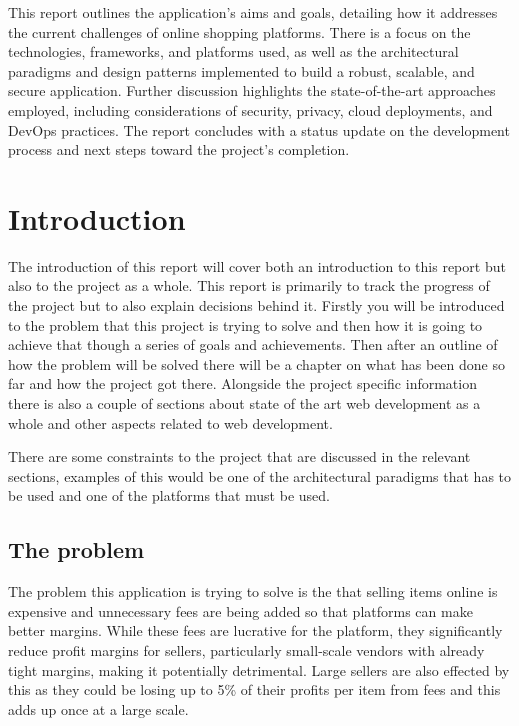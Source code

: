 \documentclass[]{project_report}
\begin{document}
This report outlines the application's aims and goals, detailing how it addresses the current challenges of online shopping platforms. There is a focus on the technologies, frameworks, and platforms used, as well as the architectural paradigms and design patterns implemented to build a robust, scalable, and secure application. Further discussion highlights the state-of-the-art approaches employed, including considerations of security, privacy, cloud deployments, and DevOps practices. The report concludes with a status update on the development process and next steps toward the project's completion.

\chapter{Introduction}

The introduction of this report will cover both an introduction to this report but also to the project as a whole. This report is primarily to track the progress of the project but to also explain decisions behind it. Firstly you will be introduced to the problem that this project is trying to solve and then how it is going to achieve that though a series of goals and achievements. Then after an outline of how the problem will be solved there will be a chapter on what has been done so far and how the project got there. Alongside the project specific information there is also a couple of sections about state of the art web development as a whole and other aspects related to web development.

There are some constraints to the project that are discussed in the relevant sections, examples of this would be one of the architectural paradigms that has to be used and one of the platforms that must be used.


\section{The problem}

The problem this application is trying to solve is the that selling items online is expensive and unnecessary fees are being added so that platforms can make better margins. While these fees are lucrative for the platform, they significantly reduce profit margins for sellers, particularly small-scale vendors with already tight margins, making it potentially detrimental. Large sellers are also effected by this as they could be losing up to 5\% of their profits per item from fees and this adds up once at a large scale.
\end{document}
